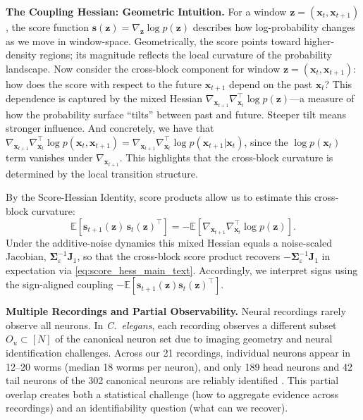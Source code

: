 \documentclass{article}
\theoremstyle{plain}
\theoremstyle{definition}
\theoremstyle{remark}
\newcommand{\E}{\mathbb{E}}
\newcommand{\1}{\mathbf{1}}
\newcommand{\x}{\bm{x}}
\newcommand{\z}{\bm{z}}
\newcommand{\s}{\bm{s}}
\newcommand{\J}{\bm{J}}
\newcommand{\Sig}{\bm{\Sigma}}
\newcommand{\Sigeps}{\Sig_\varepsilon}
\begin{document}
\textbf{The Coupling Hessian: Geometric Intuition.} For a window $\z = (\x_t, \x_{t+1})$, the score function $\s(\z) = \nabla_{\z} \log p(\z)$ describes how log-probability changes as we move in window-space. Geometrically, the score points toward higher-density regions; its magnitude reflects the local curvature of the probability landscape. Now consider the cross-block component for window $\z = (\x_t, \x_{t+1})$: how does the score with respect to the future $\x_{t+1}$ depend on the past $\x_t$? This dependence is captured by the mixed Hessian $\nabla_{\x_{t+1}} \nabla_{\x_t}^\top \log p(\z)$---a measure of how the probability surface ``tilts'' between past and future. Steeper tilt means stronger influence. And concretely, we have that $\nabla_{\x_{t+1}} \nabla_{\x_t}^\top \log p(\x_t, \x_{t+1}) = \nabla_{\x_{t+1}} \nabla_{\x_t}^\top \log p(\x_{t+1} | \x_t)$, since the $\log p(\x_t)$ term vanishes under $\nabla_{\x_{t+1}}$. This highlights that the cross-block curvature is determined by the local transition structure.


By the Score-Hessian Identity, score products allow us to estimate this cross-block curvature:
\begin{equation}
\E[\s_{t+1}(\z) \, \s_t(\z)^\top] = -\E[\nabla_{\x_{t+1}} \nabla_{\x_t}^\top \log p(\z)].
\label{eq:score_hess_main_text}
\end{equation}
Under the additive-noise dynamics %
this mixed Hessian equals a noise-scaled Jacobian, $\Sigeps^{-1} \J_1$, so that the cross-block score product recovers $-\Sigeps^{-1}\J_1$ in expectation via \eqref{eq:score_hess_main_text}. Accordingly, we interpret signs using the sign-aligned coupling $-\E[\s_{t+1}(\z)\s_t(\z)^\top]$.


\textbf{Multiple Recordings and Partial Observability.} Neural recordings rarely observe all neurons. In \emph{C.~elegans}, each recording observes a different subset $O_u \subset [N]$ of the canonical neuron set due to imaging geometry and neural identification challenges. Across our 21 recordings, individual neurons appear in 12--20 worms (median 18 worms per neuron), and only 189 head neurons and 42 tail neurons of the 302 canonical neurons are reliably identified \cite{Yemini2021}. This partial overlap creates both a statistical challenge (how to aggregate evidence across recordings) and an identifiability question (what can we recover).
\end{document}
